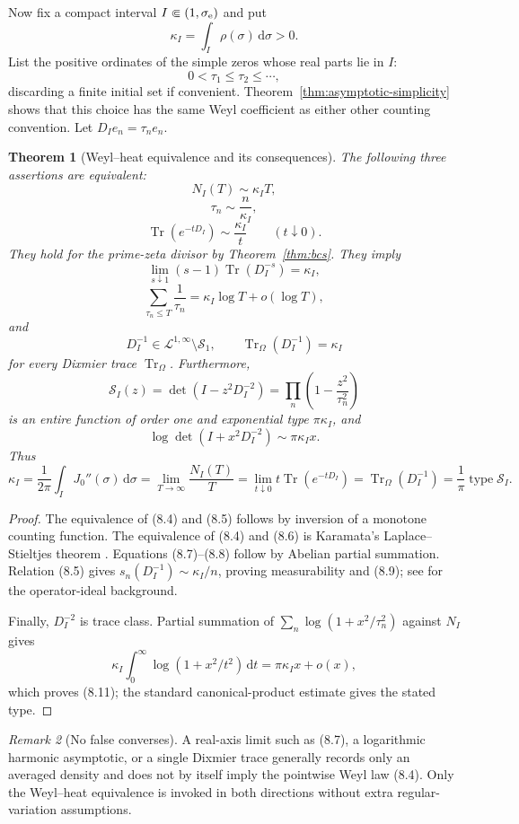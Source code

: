 \documentclass[11pt]{article}
\newtheorem{theorem}{Theorem}[section]
\theoremstyle{definition}
\theoremstyle{remark}
\newtheorem{remark}[theorem]{Remark}
\newcommand{\dd}{\,\mathrm d}
\DeclareMathOperator{\Tr}{Tr}
\DeclareMathOperator{\type}{type}
\begin{document}
Now fix a compact interval $I\Subset(1,\sigma_{\rm e})$ and put
\[
 \kappa_I=\int_I\rho(\sigma)\dd\sigma>0.
\tag{8.3}
\]
List the positive ordinates of the simple zeros whose real parts lie in $I$:
\[
 0<\tau_1\le\tau_2\le\cdots,
\]
discarding a finite initial set if convenient.  Theorem~\ref{thm:asymptotic-simplicity}
shows that this choice has the same Weyl coefficient as either other counting
convention.  Let $D_Ie_n=\tau_ne_n$.

\begin{theorem}[Weyl--heat equivalence and its consequences]
\label{thm:jessen-dixmier}
The following three assertions are equivalent:
\[
 N_I(T)\sim\kappa_IT,
\tag{8.4}
\]
\[
 \tau_n\sim\frac n{\kappa_I},
\tag{8.5}
\]
\[
 \Tr(e^{-tD_I})\sim\frac{\kappa_I}{t}
 \qquad(t\downarrow0).
\tag{8.6}
\]
They hold for the prime-zeta divisor by Theorem~\ref{thm:bcs}.  They imply
\[
 \lim_{s\downarrow1}(s-1)\Tr(D_I^{-s})=\kappa_I,
\tag{8.7}
\]
\[
 \sum_{\tau_n\le T}\frac1{\tau_n}
 =\kappa_I\log T+o(\log T),
\tag{8.8}
\]
and
\[
 D_I^{-1}\in\mathcal L^{1,\infty}\setminus\mathcal S_1,
 \qquad
 \Tr_\Omega(D_I^{-1})=\kappa_I
\tag{8.9}
\]
for every Dixmier trace $\Tr_\Omega$.  Furthermore,
\[
 \mathcal S_I(z)=\det(I-z^2D_I^{-2})
 =\prod_n\left(1-\frac{z^2}{\tau_n^2}\right)
\tag{8.10}
\]
is an entire function of order one and exponential type $\pi\kappa_I$, and
\[
 \log\det(I+x^2D_I^{-2})\sim\pi\kappa_Ix.
\tag{8.11}
\]
Thus
\[
 \boxed{
 \kappa_I
 =\frac1{2\pi}\int_IJ_0''(\sigma)\dd\sigma
 =\lim_{T\to\infty}\frac{N_I(T)}T
 =\lim_{t\downarrow0}t\Tr(e^{-tD_I})
 =\Tr_\Omega(D_I^{-1})
 =\frac1\pi\type\mathcal S_I.
 }
\tag{8.12}
\]
\end{theorem}

\begin{proof}
The equivalence of (8.4) and (8.5) follows by inversion of a monotone counting
function.  The equivalence of (8.4) and (8.6) is Karamata's Laplace--Stieltjes theorem
\cite{BGT1987}.
Equations (8.7)--(8.8) follow by Abelian partial summation.  Relation (8.5) gives
$s_n(D_I^{-1})\sim\kappa_I/n$, proving measurability and (8.9); see
\cite{Connes1994,Simon2005} for the operator-ideal background.

Finally, $D_I^{-2}$ is trace class.  Partial summation of
$\sum_n\log(1+x^2/\tau_n^2)$ against $N_I$ gives
\[
 \kappa_I\int_0^\infty\log(1+x^2/t^2)\dd t
 =\pi\kappa_Ix+o(x),
\]
which proves (8.11); the standard canonical-product estimate
\cite{Levin1996} gives the stated type.
\end{proof}

\begin{remark}[No false converses]
A real-axis limit such as (8.7), a logarithmic harmonic asymptotic, or a single Dixmier
trace generally records only an averaged density and does not by itself imply the
pointwise Weyl law (8.4).  Only the Weyl--heat equivalence is invoked in both directions
without extra regular-variation assumptions.
\end{remark}
\end{document}
